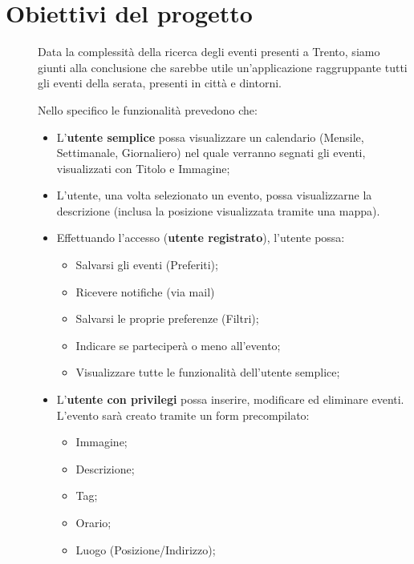\documentclass{article}
\begin{document}
\section{Obiettivi del progetto}
\begin{description}
    \item[] Data la complessità della ricerca degli eventi presenti a Trento, siamo giunti alla conclusione che sarebbe utile un'applicazione raggruppante tutti gli eventi della serata, presenti in città e dintorni.
    \item[] Nello specifico le funzionalità prevedono che:
        \begin{itemize}
            \item L'\textbf{utente semplice} possa visualizzare un calendario (Mensile, Settimanale, Giornaliero) nel quale verranno segnati gli eventi, visualizzati con Titolo e Immagine;
            \item L'utente, una volta selezionato un evento, possa visualizzarne la descrizione (inclusa la posizione visualizzata tramite una mappa).
            \item Effettuando l'accesso (\textbf{utente registrato}), l'utente possa:
                  \begin{itemize}
                      \item Salvarsi gli eventi (Preferiti);
                      \item Ricevere notifiche (via mail)
                      \item Salvarsi le proprie preferenze (Filtri);
                      \item Indicare se parteciperà o meno all'evento;
                      \item Visualizzare tutte le funzionalità dell'utente semplice;
                  \end{itemize}
            \item L'\textbf{utente con privilegi} possa inserire, modificare ed eliminare eventi. \\
                  L'evento sarà creato tramite un form precompilato:
                  \begin{itemize}
                      \item Immagine;
                      \item Descrizione;
                      \item Tag;
                      \item Orario;
                      \item Luogo (Posizione/Indirizzo);

\end{itemize}
\end{itemize}
\end{description}
\end{document}
